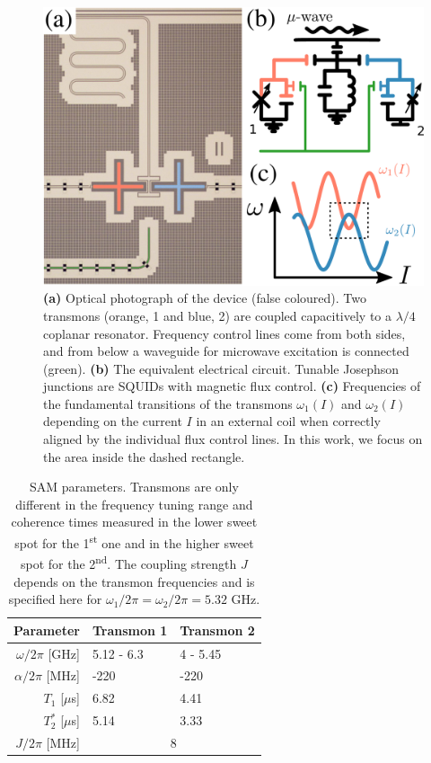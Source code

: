 \documentclass[%
 pra,
 amsmath,amssymb,
 reprint,%
]{revtex4-1}
\begin{document}
\begin{figure}
	 	\includegraphics[width=\linewidth]{experiment_2}
	\caption{\textbf{(a)} Optical photograph of 
	the device (false coloured). Two transmons 
	(orange, 1 and blue, 2) are coupled 
	capacitively to a $\lambda/4$ coplanar 
	resonator. Frequency control lines come from 
	both sides, and from below a waveguide for 
	microwave excitation  is connected (green). 
	\textbf{(b)} The equivalent electrical 
	circuit. Tunable Josephson junctions are 
	SQUIDs with magnetic flux control. 
	\textbf{(c)} Frequencies of the fundamental 
	transitions of the transmons $\omega_1(I)$ 
	and $\omega_2(I)$ depending on the current 
	$I$ in an external coil when correctly 
	aligned by the individual flux control lines. 
	In this work, we focus on the area inside the 
	dashed rectangle.}
	\label{fig:experiment}
\end{figure}


\begin{table}
	\begin{ruledtabular}
	\begin{tabular}{rll}
	Parameter & Transmon 1  & Transmon 2\\\hline
	$\omega/2\pi$ [GHz] & 5.12 - 6.3  & 4 - 5.45\\
	$\alpha/2\pi$ [MHz] & -220 & -220 \\
	$T_1$ [$\mu$s]  & 6.82 &  4.41 \\
	$T_2^*$ [$\mu$s]  & 5.14  &  3.33\\\hline
	$J/2\pi$ [MHz] &\multicolumn{2}{c}{8} 
	\end{tabular}
	\end{ruledtabular}
	\caption{SAM parameters. Transmons are only 
	different in the frequency tuning range and 
	coherence times measured in the lower sweet 
	spot for the 1\textsuperscript{st} one and in 
	the higher sweet spot for the 
	2\textsuperscript{nd}. The coupling strength 
	$J$ depends on the transmon frequencies and 
	is specified here for $\omega_1/2\pi = 
	\omega_2/2\pi = 5.32$ GHz.}
	\label{tab:parameters}
\end{table}
\end{document}
